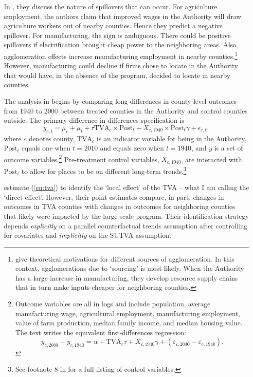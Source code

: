 \documentclass[11pt]{article}
\begin{document}
In \citet{Kline_Moretti_2014}, they discuss the nature of spillovers that can occur. For agriculture employment, the authors claim that improved wages in the Authority will draw agriculture workers out of nearby counties. Hence they predict a negative spillover. For manufacturing, the sign is ambiguous. There could be positive spillovers if electrification brought cheap power to the neighboring areas. Also, agglomeration effects increase manufacturing employment in nearby counties.\footnote{\citet{Duranton_Puga_2003} give theoretical motivations for different sources of agglomeration. In this context, agglomerations due to `sourcing' is most likely. When the Authority has a large increase in manufacturing, they develop resource supply chains that in turn make inputs cheaper for neighboring counties.} However, manufacturing could decline if firms chose to locate in the Authority that would have, in the absence of the program, decided to locate in nearby counties. 

The analysis in \citet{Kline_Moretti_2014} begins by comparing long-differences in county-level outcomes from 1940 to 2000 between treated counties in the Authority and control counties outside. The primary difference-in-differences specification is
\begin{equation}\label{eq:tva}
    y_{c, t} = \mu_c + \mu_t + \tau \text{TVA}_c \times \text{Post}_t + X_{c, 1940} \times \text{Post}_t \gamma + \epsilon_{c,t},
\end{equation}
where $c$ denotes county, $\text{TVA}_c$ is an indicator variable for being in the Authority, $\text{Post}_t$ equals one when $t = 2010$ and equals zero when $t = 1940$, and $y$ is a set of outcome variables.\footnote{Outcome variables are all in logs and include population, average manufacturing wage, agricultural employment, manufacturing employment, value of farm production, median family income, and median housing value. The text writes the equivalent first-differences regression: \[ 
    y_{c, 2000} - y_{c, 1940} = \alpha + \text{TVA}_c \tau + X_{c, 1940} \gamma + (\varepsilon_{c, 2000} - \varepsilon_{c, 1940}). 
\]} Pre-treatment control variables, $X_{c,1940}$, are interacted with $\text{Post}_t$ to allow for places to be on different long-term trends.\footnote{See footnote 8 in \citet{Kline_Moretti_2014} for a full listing of control variables.} 

\citet{Kline_Moretti_2014} estimate (\ref{eq:tva}) to identify the `local effect' of the TVA -- what I am calling the `direct effect'. However, their point estimates compare, in part, changes in outcomes in TVA counties with changes in outcomes for neighboring counties that likely were impacted by the large-scale program. Their identification strategy depends \emph{explicitly} on a parallel counterfactual trends assumption after controlling for covariates and \emph{implicitly} on the SUTVA assumption. 
\end{document}
